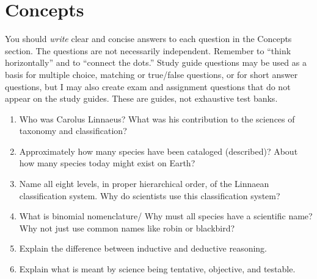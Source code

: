 \documentclass[letterpaper]{tufte-handout}
\begin{document}
\section{Concepts}

You should \emph{write} clear and concise answers to each question in the Concepts section.  The questions are not necessarily independent.  Remember to “think horizontally” and to “connect the dots.”  Study guide questions may be used as a basis for multiple choice, matching or true/false questions, or for short answer questions, but I may also create exam and assignment questions that do not appear on the study guides.  These are guides, not exhaustive test banks.

\begin{enumerate}
	\item Who was Carolus Linnaeus? What was his contribution to the sciences of taxonomy and classification?

	\item Approximately how many species have been cataloged (described)? About how many species today might exist on Earth?
	
	\item Name all eight levels, in proper hierarchical order, of the Linnaean classification system. Why do scientists use this classification system?
	
	\item What is binomial nomenclature/ Why must all species have a scientific name? Why not just use common names like robin or blackbird?

	\item Explain the difference between inductive and deductive reasoning. 
	
	\item Explain what is meant by science being tentative, objective, and testable.
\end{enumerate}
\end{document}
